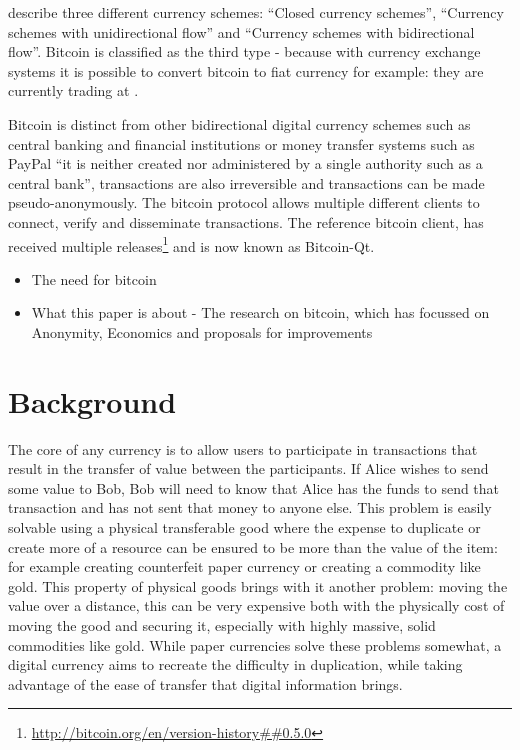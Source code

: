 \textcite{euro-currency-schemes} describe three different currency schemes: ``Closed currency schemes'', ``Currency schemes with unidirectional
flow'' and ``Currency schemes with bidirectional flow''. Bitcoin is classified as the third type - because with currency exchange systems it is possible to convert bitcoin to fiat currency for example: they are currently trading at .


Bitcoin is distinct from other bidirectional digital currency schemes such as central banking
and financial institutions or money transfer systems such as PayPal\cite{paypal}
``it is neither created nor administered by a single authority such as a central bank''\cite{why-interesting}, transactions are also irreversible and transactions can be made pseudo-anonymously.  The bitcoin
protocol allows multiple different clients to connect, verify and disseminate
transactions.  The reference bitcoin client, has received multiple releases\footnote{\url{http://bitcoin.org/en/version-history##0.5.0}} and
is now known as Bitcoin-Qt\cite{bitcoin-qt}.

\begin{itemize} \item The need for bitcoin \item What this paper is about - The
    research on bitcoin, which has focussed on Anonymity, Economics and
    proposals for improvements \end{itemize}

\section{Background}
The core of any currency is to allow users to participate in transactions that result in the transfer of value between the participants. If Alice wishes to send some value to Bob, Bob will need to know that Alice has the funds to send that transaction and has not sent that money to anyone else. This problem is easily solvable using a physical transferable good where the expense to duplicate or create more of a resource can be ensured to be more than the value of the item: for example creating counterfeit paper currency or creating a commodity like gold.  This property of physical goods brings with it another problem: moving the value over a distance, this can be very expensive both with the physically cost of moving the good and securing it, especially with highly massive, solid commodities like gold. While paper currencies solve these problems somewhat, a digital currency aims to recreate the difficulty in duplication, while taking advantage of the ease of transfer that digital information brings.


